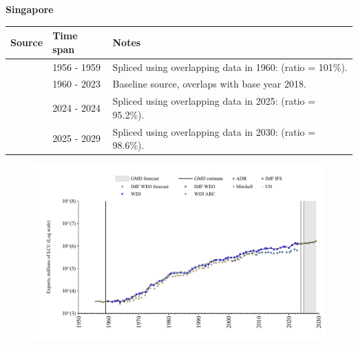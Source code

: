 \documentclass[12pt,a4paper,landscape]{article}
\begin{document}
\begin{adjustbox}{max totalsize={\paperwidth}{\paperheight},center}
\begin{minipage}[t][\textheight][t]{\textwidth}
\vspace*{0.5cm}
{}
\begin{center}
{\Large\bfseries Singapore}
\end{center}
\vspace{0.5cm}
\begin{table}[H]
\centering
\small
\begin{tabular}{|l|l|l|}
\hline
\textbf{Source} & \textbf{Time span} & \textbf{Notes} \\
\hline
\rowcolor{white}\cite{Mitchell}& 1956 - 1959 &Spliced using overlapping data in 1960: (ratio = 101\%).\\
\rowcolor{lightgray}\cite{WDI}& 1960 - 2023 &Baseline source, overlaps with base year 2018.\\
\rowcolor{white}\cite{IMF_IFS}& 2024 - 2024 &Spliced using overlapping data in 2025: (ratio = 95.2\%).\\
\rowcolor{lightgray}\cite{IMF_WEO_forecast}& 2025 - 2029 &Spliced using overlapping data in 2030: (ratio = 98.6\%).\\
\hline
\end{tabular}
\end{table}
\begin{figure}[H]
\centering
\includegraphics[width=\textwidth,height=0.6\textheight,keepaspectratio]{graphs/SGP_exports.pdf}
\end{figure}
\end{minipage}
\end{adjustbox}
\end{document}
